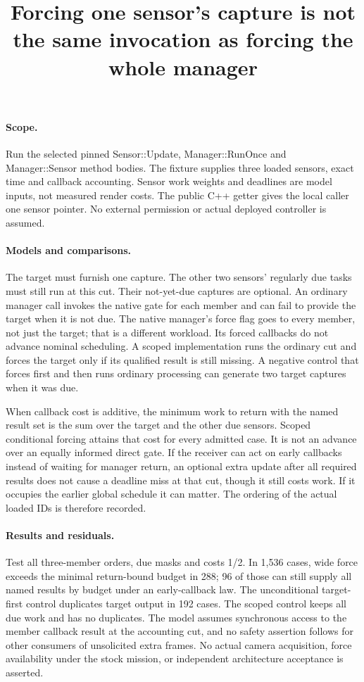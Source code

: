 \documentclass{article}
\begin{document}
\title{Forcing one sensor's capture is not the same invocation as forcing the whole manager}
\maketitle

\paragraph{Scope.}
Run the selected pinned Sensor::Update, Manager::RunOnce and
Manager::Sensor method bodies. The fixture supplies three loaded
sensors, exact time and callback accounting. Sensor work weights
and deadlines are model inputs, not measured render costs.
The public C++ getter gives the local caller one sensor pointer.
No external permission or actual deployed controller is assumed.

\paragraph{Models and comparisons.}
The target must furnish one capture. The other two sensors'
regularly due tasks must still run at this cut. Their not-yet-due
captures are optional. An ordinary manager call invokes the
native gate for each member and can fail to provide the target
when it is not due. The native manager's force flag goes to
every member, not just the target; that is a different workload.
Its forced callbacks do not advance nominal scheduling.
A scoped implementation runs the ordinary cut and forces the
target only if its qualified result is still missing.
A negative control that forces first and then runs ordinary
processing can generate two target captures when it was due.

When callback cost is additive, the minimum work to return
with the named result set is the sum over the target and the
other due sensors. Scoped conditional forcing attains that
cost for every admitted case. It is not an advance over an
equally informed direct gate. If the receiver can act on
early callbacks instead of waiting for manager return, an
optional extra update after all required results does not
cause a deadline miss at that cut, though it still costs work.
If it occupies the earlier global schedule it can matter.
The ordering of the actual loaded IDs is therefore recorded.

\paragraph{Results and residuals.}
Test all three-member orders, due masks and costs 1/2. In
1,536 cases, wide force exceeds the minimal return-bound
budget in 288; 96 of those can still supply all named
results by budget under an early-callback law. The unconditional
target-first control duplicates target output in 192 cases.
The scoped control keeps all due work and has no duplicates.
The model assumes synchronous access to the member callback
result at the accounting cut, and no safety assertion follows
for other consumers of unsolicited extra frames. No actual
camera acquisition, force availability under the stock mission,
or independent architecture acceptance is asserted.
\end{document}
